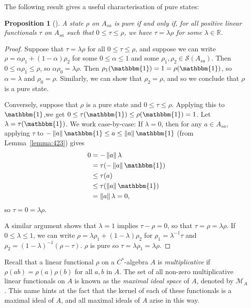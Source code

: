 \documentclass[11pt,a4paper]{report}
\theoremstyle{plain}
\newtheorem{prop}{Proposition}
\theoremstyle{definition}
\newcommand{\1}{\mathbbm{1}}
\newcommand{\R}{\mathbb{R}}
\newcommand{\M}{\mathcal{M}}
\renewcommand{\S}{\mathscr{S}}
\begin{document}
The following result gives a useful characterisation of pure states:
\begin{prop}[{\cite[3.4.6]{kadison83}}]\label{prop:pure2}
	A state $\rho$ on $A_{sa}$ is pure if and only if, for all positive linear 
	functionals $\tau$ on $A_{sa}$ such that $0\leq\tau\leq\rho$, we have $\tau 
	=\lambda\rho$ for some $\lambda\in\R$. 

\end{prop}
\begin{proof}
	Suppose that $\tau =\lambda\rho$ for all $0\leq\tau\leq\rho$, and suppose we can 
	write $\rho=\alpha\rho_1+(1-\alpha)\rho_2$ for some $0\leq\alpha\leq1$ and some 
	$\rho_1,\rho_2 \in\S(A_{sa})$. Then $0\leq\alpha\rho_1\leq\rho$, so 
	$\alpha\rho_0 = \lambda\rho$. Then $\rho_1(\1)=1=\rho(\1)$, so $\alpha = 
	\lambda$ and $\rho_0 =\rho$. Similarly, we can show that $\rho_2=\rho$, and so 
	we conclude that $\rho$ is a pure state.

	
	Conversely, suppose that $\rho$ is a pure state and $0\leq\tau\leq\rho$. 
	Applying this to $\1$,we get $0\leq\tau(\1)\leq\rho(\1) = 1$. Let $\lambda = 
	\tau(\1)$. We work case-by-case: If $\lambda=0$, then for any $a\in A_{sa}$, 
	applying $\tau$ to $-\left\|a\right\|\1 \leq a \leq\left\|a\right\|\1$ (from 
	Lemma~\ref{lemma:423}) gives
	\begin{align*}
		0&=		-\left\|a\right\|\lambda 													\\
		&= 		\tau(-\left\|a\right\|\1) 													\\
		&\leq 	\tau(a) 																	\\
		&\leq 	\tau(\left\|a\right\|\1) 													\\
		&= 		\left\|a\right\| \lambda = 0,
	\end{align*}
	so $\tau=0=\lambda\rho$.
	
	A similar argument shows that $\lambda=1$ implies $\tau-\rho=0$, so that 
	$\tau=\rho=\lambda\rho$. If $0\leq\lambda\leq 1$, we can write 
	$\rho=\lambda\rho_1+(1-\lambda)\rho_2$ for $\rho_1=\lambda^{-1}\tau$ and 
	$\rho_2=(1-\lambda)^{-1}(\rho-\tau)$. $\rho$ is pure so 
	$\tau=\lambda\rho_1=\lambda\rho$.

	
\end{proof}
Recall that a linear functional $\rho$ on a $C^\ast$-algebra $A$ is 
\emph{multiplicative} if $\rho(ab)=\rho(a)\rho(b)$ for all $a,b$ in $A$. The set 
of all non-zero multiplicative linear functionals on $A$ is known as the 
\emph{maximal ideal space} of $A$, denoted by $\M_A$. This name hints at the fact 
that the kernel of each of these functionals is a maximal ideal of $A$, and all 
maximal ideals of $A$ arise in this way.~\cite[Theorem I.2.5]{davidson96}
\end{document}
